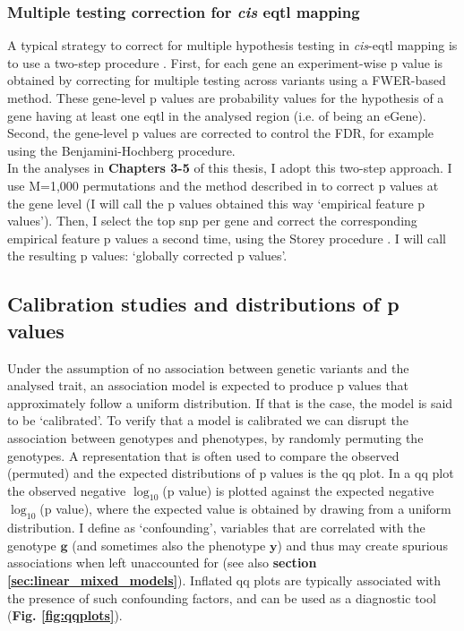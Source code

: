 \subsubsection{Multiple testing correction for \textit{cis} e\gls{qtl} mapping}

A typical strategy to correct for multiple hypothesis testing in \textit{cis}-e\gls{qtl} mapping is to use a two-step procedure \cite{gtex2015genotype}. 
First, for each gene an experiment-wise p value is obtained by correcting for multiple testing across variants using a FWER-based method. 
These gene-level p values are probability values for the hypothesis of a gene having at least one e\gls{qtl} in the analysed region (i.e. of being an eGene). 
Second, the gene-level p values are corrected to control the FDR, for example using the Benjamini-Hochberg procedure.\\

In the analyses in \textbf{Chapters 3-5} of this thesis, I adopt this two-step approach.
I use M=1,000 permutations and the method described in \cite{ongen2016fast} to correct p values at the gene level (I will call the p values obtained this way `empirical feature p values').
Then, I select the top \gls{snp} per gene and correct the corresponding empirical feature p values a second time, using the Storey procedure \cite{storey2002direct}.
I will call the resulting p values: `globally corrected p values'.

\subsection{Calibration studies and distributions of p values}

Under the assumption of no association between genetic variants and the analysed trait, an association model is expected to produce p values that approximately follow a uniform distribution.
If that is the case, the model is said to be `calibrated'.
To verify that a model is calibrated we can disrupt the association between genotypes and phenotypes, by randomly permuting the genotypes. 
A representation that is often used to compare the observed (permuted) and the expected distributions of p values is the \gls{qq} plot. 
In a \gls{qq} plot the observed negative $\log_{10}$(p value) is plotted against the expected negative $\log_{10}$(p value), where the expected value is obtained by drawing from a uniform distribution. 
I define as `confounding', variables that are correlated with the genotype $\mathbf{g}$ (and sometimes also the phenotype $\mathbf{y}$) and thus may create spurious associations when left unaccounted for (see also \textbf{section \ref{sec:linear_mixed_models}}).
Inflated \gls{qq} plots are typically associated with the presence of such confounding factors, and can be used as a diagnostic tool (\textbf{Fig. \ref{fig:qqplots}}). 

